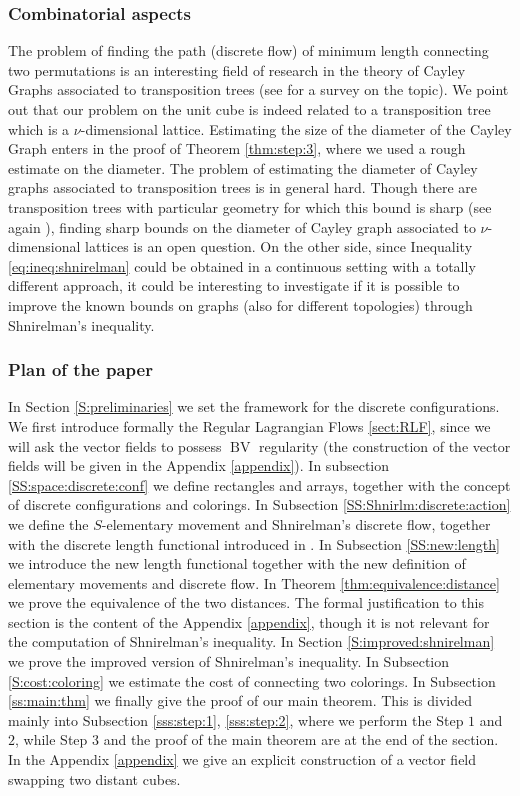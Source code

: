 \documentclass[12 pt]{article}
\theoremstyle{definition} \newtheorem{definition}{Definition}[section]
\theoremstyle{definition} \newtheorem{remark}[definition]{Remark}
\theoremstyle{plain} \newtheorem{lemma}[definition]{Lemma}
\theoremstyle{plain} \newtheorem{proposition}[definition]{Proposition}
\theoremstyle{plain} \newtheorem{theorem}[definition]{Theorem}
\theoremstyle{plain} \newtheorem{corollary}[definition]{Corollary}
\theoremstyle{definition} \newtheorem{example}[definition]{Example}
\theoremstyle{definition} \newtheorem{assumption}[definition]{Assumption}
\theoremstyle{definition} \newtheorem{conjecture}[definition]{Conjecture}
\DeclareMathOperator{\BV}{BV}
\newcommand{\1}{\mathbbm 1}
\numberwithin{equation}{section}
\begin{document}
\subsubsection{Combinatorial aspects}
The problem of finding the path (discrete flow) of minimum length connecting two permutations is an interesting field of research in the theory of Cayley Graphs associated to transposition trees (see \cite{DohanKim} for a survey on the topic).
We point out that our problem on the unit cube is indeed related to a transposition tree which is a $\nu$-dimensional lattice. Estimating the size of the diameter of the Cayley Graph enters in the proof of Theorem \ref{thm:step:3}, where we used a rough estimate on the diameter. The problem of estimating the diameter of Cayley graphs associated to transposition trees is in general hard. Though there are transposition trees with particular geometry for which this bound is sharp (see again \cite{DohanKim}), finding sharp bounds on the diameter of Cayley graph associated to $\nu$-dimensional lattices is an open question.  On the other side, since Inequality \eqref{eq:ineq:shnirelman} could be obtained in a continuous setting with a totally different approach, it could be interesting to investigate if it is possible to improve the known bounds on graphs (also for different topologies) through Shnirelman's inequality.


\subsubsection{Plan of the paper}
In Section \ref{S:preliminaries} we set the framework for the discrete configurations. We first introduce formally the Regular Lagrangian Flows \ref{sect:RLF}, since we will ask the vector fields to possess $\BV$ regularity (the construction of the vector fields will be given in the Appendix \ref{appendix}). In subsection \ref{SS:space:discrete:conf} we define rectangles and arrays, together with the concept of discrete configurations and colorings. In Subsection \ref{SS:Shnirlm:discrete:action} we define the $S$-elementary movement and Shnirelman's discrete flow, together with the discrete length functional introduced in \cite{Shnirelman}. In Subsection \ref{SS:new:length} we introduce the new length functional together with the new definition of elementary movements and discrete flow. In Theorem \ref{thm:equivalence:distance} we prove the equivalence of the two distances. The formal justification to this section is the content of the Appendix \ref{appendix}, though it is not relevant for the computation of Shnirelman's inequality. In Section \ref{S:improved:shnirelman} we prove the improved version of Shnirelman's inequality. In Subsection \ref{S:cost:coloring} we estimate the cost of connecting two colorings. In Subsection \ref{ss:main:thm} we finally give the proof of our main theorem. This is divided mainly into Subsection \ref{sss:step:1}, \ref{sss:step:2}, where we perform the Step $1$ and $2$, while Step $3$ and the proof of the main theorem are at the end of the section. In the Appendix \ref{appendix} we give an explicit construction of a vector field swapping two distant cubes. 
\end{document}
